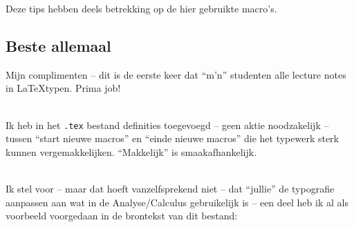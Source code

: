 \documentclass{2wa40summary}
\begin{document}
		\opm Deze tips hebben deels betrekking op de hier gebruikte macro's.
		
		\subsection{Beste allemaal}
		
		Mijn complimenten -- dit is de eerste keer dat ``m'n'' studenten alle lecture notes in \LaTeX typen.
		Prima job!
		
		\ \\
		Ik heb in het \verb$.tex$ bestand definities toegevoegd -- geen aktie noodzakelijk -- tussen
		``start nieuwe macros'' en ``einde nieuwe macros'' die het
		typewerk sterk kunnen vergemakkelijken. ``Makkelijk'' is smaakafhankelijk.
		
		\ \\
		Ik stel voor -- maar dat hoeft vanzelfsprekend niet -- dat ``jullie'' de typografie aanpassen aan wat in de Analyse/Calculus gebruikelijk is -- een deel heb ik al als voorbeeld voorgedaan in de brontekst van dit bestand:
\end{document}
